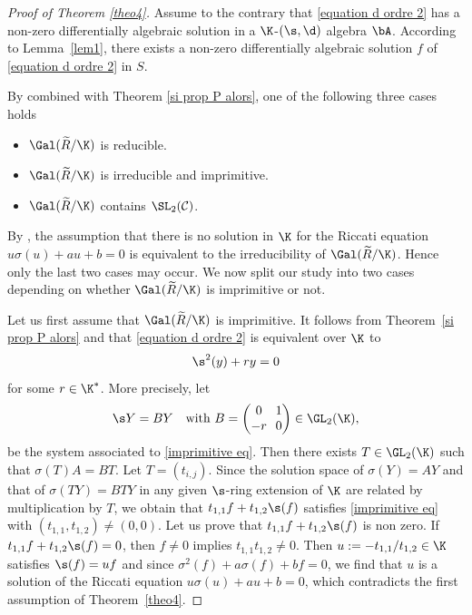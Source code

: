 \begin{proof}[Proof of Theorem \ref{theo4}]
Assume to the contrary that \eqref{equation d ordre 2} has a non-zero differentially algebraic solution in a $\K$-$(\s,\d)$ algebra $\bA$. According to Lemma~\ref{lem1}, there exists a non-zero differentially algebraic solution $f$ of \eqref{equation d ordre 2} in $S$.\par

By \cite[Lem.\,4.1]{Hen98} combined with Theorem \ref{si prop P alors}, one of the following three cases holds
\begin{itemize}
\item $\Gal(\widetilde{R}/\K)$ is reducible.
\item $\Gal(\widetilde{R}/\K)$ is irreducible and imprimitive.
\item $\Gal(\widetilde{R}/\K)$ contains $\SL_{2}(\mathcal{C})$.
\end{itemize}

By \cite[Lem.\,13]{dreyfus2015galois}, the assumption that there is no solution in $\K$ for the Riccati equation $u\sigma(u)+au+b=0$ is equivalent to the irreducibility of $\Gal(\widetilde{R}/\K)$. Hence only the last two cases may occur. We now split our study into two cases depending on whether $\Gal(\widetilde{R}/\K)$ is imprimitive or not.

Let us first assume that $\Gal(\widetilde{R}/\K)$ is imprimitive. It follows from Theorem~\ref{si prop P alors} and \cite[\S 4.3]{Hen98} that \eqref{equation d ordre 2} is equivalent over $\K$ to
\begin{equation} \label{imprimitive eq}
\s^2(y)+ry=0
\end{equation}
for some $r\in \K^{*}$. More precisely, let
\[\arraycolsep3.5pt
\s Y=BY \quad\text{with } B= \begin{pmatrix}
0&1\\
-r&0
\end{pmatrix} \in \GL_{2}(\K),
\]
be the system associated to \eqref{imprimitive eq}.
Then there exists
$T\in \GL_{2}(\K)$ such that
$\sigma(T)A=BT$. Let $T=(t_{i,j})$. Since the solution space of $\sigma(Y)=AY$ and that of \hbox{$\sigma(TY)=BTY$} in any given $\s$-ring extension of $\K$ are related by multiplication by $T$, we obtain that $t_{1,1}f+t_{1,2}\s(f)$ satisfies \eqref{imprimitive eq} with $(t_{1,1},t_{1,2})\neq (0,0)$. Let us prove that $t_{1,1}f+t_{1,2}\s(f)$ is non zero. If $t_{1,1}f+t_{1,2}\s(f)=0$, then $f\neq 0$ implies $t_{1,1}t_{1,2}\neq 0$. Then $u:=-t_{1,1}/t_{1,2}\in\K$ satisfies $\s (f)=uf$ and since $\sigma^{2}(f)+a\sigma (f)+bf=0$, we find that $u$ is a solution of the Riccati equation $u\sigma(u)+au+b=0$, which contradicts the first assumption of Theorem~\ref{theo4}.


\end{proof}
